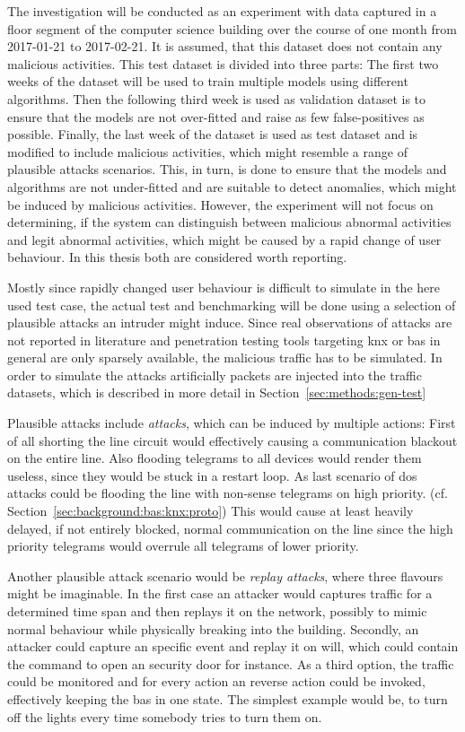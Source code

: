 The investigation will be conducted as an experiment with data captured in a floor segment of the computer science building over the course of one month from 2017-01-21 to 2017-02-21. It is assumed, that this dataset does not contain any malicious activities.
This test dataset is divided into three parts:
The first two weeks of the dataset will be used to train multiple models using different algorithms.
Then the following third week is used as validation dataset is to ensure that the models are not over-fitted and raise as few false-positives as possible.
Finally, the last week of the dataset is used as test dataset and is modified to include malicious activities, which might resemble a range of plausible attacks scenarios.
This, in turn, is done to ensure that the models and algorithms are not under-fitted and are suitable to detect anomalies, which might be induced by malicious activities.
However, the experiment will not focus on determining, if the system can distinguish between malicious abnormal activities and legit abnormal activities, which might be caused by a rapid change of user behaviour. In this thesis both are considered worth reporting.

Mostly since rapidly changed user behaviour is difficult to simulate in the here used test case, the actual test and benchmarking will be done using a selection of plausible attacks an intruder might induce.
Since real observations of attacks are not reported in literature and penetration testing tools targeting \gls{knx} or \gls{bas} in general are only sparsely available, the malicious traffic has to be simulated. In order to simulate the attacks artificially packets are injected into the traffic datasets, which is described in more detail in Section~\ref{sec:methods:gen-test}

Plausible attacks include \emph{ attacks}, which can be induced by multiple actions: First of all shorting the line circuit would effectively causing a communication blackout on the entire line. Also flooding  telegrams to all devices would render them useless, since they would be stuck in a restart loop. As last scenario of \gls{dos} attacks could be flooding the line with non-sense telegrams on high priority. (cf. Section~\ref{sec:background:bas:knx:proto})
This would cause at least heavily delayed, if not entirely blocked, normal communication on the line since the high priority telegrams would overrule all telegrams of lower priority.

Another plausible attack scenario would be \emph{replay attacks}, where three flavours might be imaginable.
In the first case an attacker would captures traffic for a determined time span and then replays it on the network, possibly to mimic normal behaviour while physically breaking into the building.
Secondly, an attacker could capture an specific event and replay it on will, which could contain the command to open an security door for instance.
As a third option, the traffic could be monitored and for every action an reverse action could be invoked, effectively keeping the \gls{bas} in one state. The simplest example would be, to turn off the lights every time somebody tries to turn them on.

